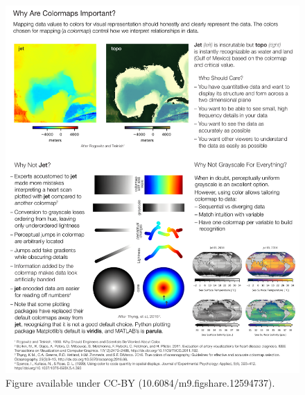 \documentclass[10pt,journal,compsoc]{IEEEtran}
\begin{document}
\begin{figure}
	\includegraphics[width=\textwidth]{figures/motivation.pdf}
	\caption{Figure available under CC-BY (10.6084/m9.figshare.12594737).}
	\label{fig:motivation}
\end{figure}
\end{document}
